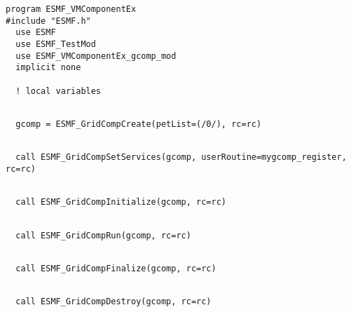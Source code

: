 
 \begin{verbatim}
program ESMF_VMComponentEx
#include "ESMF.h"
  use ESMF
  use ESMF_TestMod
  use ESMF_VMComponentEx_gcomp_mod
  implicit none
  
  ! local variables
 
\end{verbatim}
 

 \begin{verbatim}
  gcomp = ESMF_GridCompCreate(petList=(/0/), rc=rc)
 
\end{verbatim}
 

 \begin{verbatim}
  call ESMF_GridCompSetServices(gcomp, userRoutine=mygcomp_register, rc=rc)
 
\end{verbatim}
 

 \begin{verbatim}
  call ESMF_GridCompInitialize(gcomp, rc=rc)
 
\end{verbatim}
 

 \begin{verbatim}
  call ESMF_GridCompRun(gcomp, rc=rc)
 
\end{verbatim}
 

 \begin{verbatim}
  call ESMF_GridCompFinalize(gcomp, rc=rc)
 
\end{verbatim}
 

 \begin{verbatim}
  call ESMF_GridCompDestroy(gcomp, rc=rc)
 
\end{verbatim}
 

